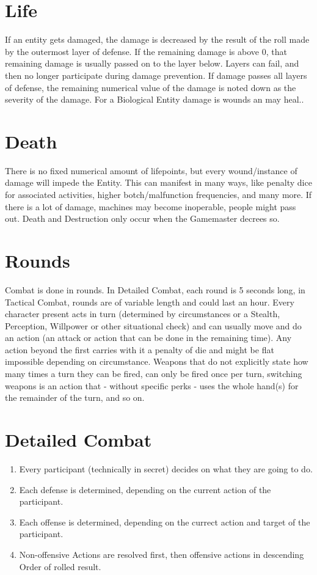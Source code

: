 \section{Life}\label{sec:life}
If an entity gets damaged, the damage is decreased by the result of the roll made by the outermost layer of defense.
If the remaining damage is above 0, that remaining damage is usually passed on to the layer below.
Layers can fail, and then no longer participate during damage prevention.
If damage passes all layers of defense,
the remaining numerical value of the damage is noted down as the severity of the damage.
For a Biological Entity damage is wounds an may heal..
\section{Death}\label{sec:death}
There is no fixed numerical amount of lifepoints, but every wound/instance of damage will impede the Entity.
This can manifest in many ways, like penalty dice for associated activities, higher botch/malfunction frequencies,
and many more.
If there is a lot of damage, machines may become inoperable, people might pass out.
Death and Destruction only occur when the Gamemaster decrees so.
\section{Rounds}\label{sec:rounds}
Combat is done in rounds.
In Detailed Combat, each round is 5 seconds long, in Tactical Combat, rounds are of variable length and could
last an hour.
Every character present acts in turn (determined by circumstances or a Stealth, Perception, Willpower or other
situational check) and can usually move and do an action (an attack or action that can be done in the remaining time).
Any action beyond the first carries with it a penalty of die and might be flat impossible depending on circumstance.
Weapons that do not explicitly state how many times a turn they can be fired, can only be fired once per turn, switching
weapons is an action that - without specific perks - uses the whole hand(s) for the remainder of the turn, and so on.

\section{Detailed Combat}\label{sec:detailed-combat}
\begin{enumerate}
    \item Every participant (technically in secret) decides on what they are going to do.
    \item Each defense is determined, depending on the current action of the participant.
    \item Each offense is determined, depending on the currect action and target of the participant.
    \item Non-offensive Actions are resolved first, then offensive actions in descending Order of rolled result.
\end{enumerate}

